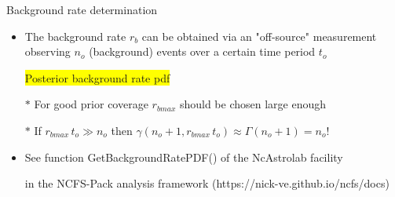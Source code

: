 \onecolumn
\begin{center}
{\red Background rate determination} 
\end{center}
%
\begin{itemize}
\item The background rate $r_{b}$ can be obtained via an "off-source" measurement\\
      observing $n_{o}$ (background) events over a certain time period $t_{o}$
\item[] \begin{center}
        \colorbox{yellow}{Posterior background rate pdf}\\[1mm]
        {\blue {}}
        \end{center}
\item[$\ast$] For good prior coverage $r_{bmax}$ should be chosen large enough
\item[$\ast$] If $r_{bmax}\,t_{o} \gg n_{o}$ then $\gamma(n_{o}+1,r_{bmax}\,t_{o}) \approx \Gamma(n_{o}+1)=n_{o}!$
\item {\blue See function GetBackgroundRatePDF() of the NcAstrolab facility}
\item[] {\blue in the NCFS-Pack analysis framework (https://nick-ve.github.io/ncfs/docs)}
\end{itemize}

